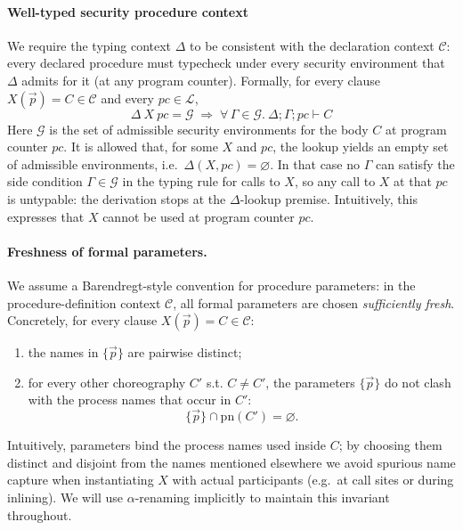 \documentclass[12pt,a4paper,twoside]{book}
\newcommand{\pn}{\mathrm{pn}}
\begin{document}
\paragraph{Well-typed security procedure context}
We require the typing context \(\Delta\) to be consistent with the declaration context \(\mathscr{C}\): every declared procedure must typecheck under every security environment that \(\Delta\) admits for it (at any program counter). Formally, for every clause \(X(\vec{p}) = C \in \mathscr{C}\) and every \(pc \in \mathscr{L}\),
\begin{equation}\label{ass:wellt_ctx}
  \Delta~X~pc = \mathcal{G}
  \;\Longrightarrow\;
  \forall\,\Gamma \in \mathcal{G}.\ \Delta;\Gamma;pc \vdash C
\end{equation}
Here \(\mathcal{G}\) is the set of admissible security environments for the body \(C\) at program counter \(pc\).
It is allowed that, for some \(X\) and \(pc\), the lookup yields an empty set of admissible environments, i.e.\ \(\Delta(X,pc)=\varnothing\).
In that case no \(\Gamma\) can satisfy the side condition \(\Gamma \in \mathcal{G}\) in the typing rule for calls to \(X\), so any call to \(X\) at that \(pc\) is untypable: the derivation stops at the \(\Delta\)-lookup premise. Intuitively, this expresses that \(X\) cannot be used at program counter \(pc\).

\paragraph{Freshness of formal parameters.}
\label{ass:fresh}
We assume a Barendregt-style convention for procedure parameters\cite{barendregt1984lambda}: in the procedure-definition context \(\mathscr{C}\), all formal parameters are chosen \emph{sufficiently fresh}. Concretely, for every clause \(X(\vec{p}) = C \in \mathscr{C}\):
\begin{enumerate}
  \item the names in \(\{\vec{p}\}\) are pairwise distinct;
  \item for every other choreography $C'$ s.t. \(C \neq C'\), the parameters \(\{\vec{p}\}\) do not clash with the process names that occur in \(C'\):
  \[
    \{\vec{p}\} \cap \pn(C') = \varnothing.
  \]
\end{enumerate}
Intuitively, parameters bind the process names used inside \(C\); by choosing them distinct and disjoint from the names mentioned elsewhere we avoid spurious name capture when instantiating \(X\) with actual participants (e.g.\ at call sites or during inlining). We will use \(\alpha\)-renaming implicitly to maintain this invariant throughout.
\end{document}
